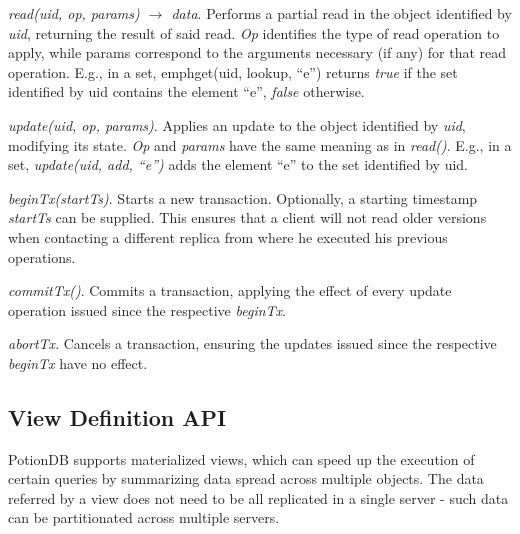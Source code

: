 \documentclass{vldb}
\newcommand{\grumbler}[2]{{\color{red}{\bf #1:} #2}}
\renewcommand{\grumbler}[2]{}
\newcommand{\andre}[1]{\grumbler{andre}{#1}}
\begin{document}
\emph{read(uid, op, params) $\rightarrow$ data}. Performs a partial read in the object identified by \emph{uid}, returning the result of said read. 
\emph{Op} identifies the type of read operation to apply, while params correspond to the arguments necessary (if any) for that read operation.
E.g., in a set, emph{get(uid, lookup, ``e'')} returns \emph{true} if the set identified by uid contains the element ``e'', \emph{false} otherwise.

\emph{update(uid, op, params)}. Applies an update to the object identified by \emph{uid}, modifying its state.
\emph{Op} and \emph{params} have the same meaning as in \emph{read()}.
E.g., in a set, \emph{update(uid, add, ``e'')} adds the element ``e'' to the set identified by uid.

\emph{beginTx(startTs)}. Starts a new transaction. Optionally, a starting timestamp \emph{startTs} can be supplied. This ensures that a client will not read older versions when contacting a different replica from where he executed his previous operations.
\andre{TODO: Add reference to some place where I explain this properly...?}

\emph{commitTx()}. Commits a transaction, applying the effect of every update operation issued since the respective \emph{beginTx}.

\emph{abortTx}. Cancels a transaction, ensuring the updates issued since the respective \emph{beginTx} have no effect.

\andre{I think somewhere I'll have to explain the following: a) how beginTx works when receiving a startTs; b) how are commits/aborts handled (i.e., when updates are applied); c) that reads return right away and consider the temporary effects of updates issued in that transaction}


%
%


\subsection{View Definition API}
\label{subsec:viewAPI}

PotionDB supports materialized views, which can speed up the execution of certain queries by summarizing data spread across multiple objects.
The data referred by a view does not need to be all replicated in a single server - such data can be partitionated across multiple servers.
\end{document}
